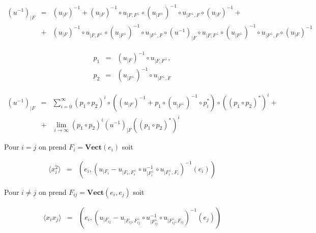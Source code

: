 \begin{aff}
\begin{eqnarray*}
	\left (u^{-1} \right )_{\vert F} & = & 	 \left (u_{\vert F }\right )^{-1}  +  \left (u_{\vert F }\right )^{-1} \circ u_{\vert F , F^\perp }\circ  \left ( u_{\vert F^\perp } \right)^{-1} \circ u_{\vert F^\perp , F } \circ  \left (u_{\vert F }\right )^{-1} + \\
	& + & \left (u_{\vert F }\right )^{-1} \circ u_{\vert F , F^\perp }\circ \left (u_{\vert F^\perp }\right )^{-1} \circ u_{\vert F ^\perp, F }\circ \left (u^{-1} \right )_{\vert F} \circ u_{\vert F, F ^\perp } \circ \left (u_{\vert F^\perp }\right )^{-1} \circ  u_{\vert F ^\perp, F } \circ \left (u_{\vert F }\right )^{-1}
\end{eqnarray*}

\begin{eqnarray*}
	p_1 & = & 	\left (u_{\vert F }\right )^{-1} \circ u_{\vert F , F^\perp } , \\
	p_2 & = & \left (u_{\vert F^\perp }\right )^{-1} \circ u_{\vert F ^\perp, F }
\end{eqnarray*}

\begin{eqnarray*}
	\left (u^{-1} \right )_{\vert F}  & = & \sum_{i = 0 }^\infty (p_	1 \circ p_2)^i \circ \left ( \left (u_{\vert F }\right )^{-1} + p_1 \circ \left ( u_{\vert F^\perp } \right)^{-1}  \circ p_i^\ast \right ) \circ	((p_	1 \circ p_2)^\ast )^i + \\
	&+ & \underset{i \to \infty}{\lim}  (p_	1 \circ p_2)^i \left (u^{-1} \right )_{\vert F} ((p_	1 \circ p_2)^\ast )^i
\end{eqnarray*}


	
\end{aff}



Pour $i = j$ on prend $F_i = \mathbf{Vect} ( e_i) $ soit 

\begin{eqnarray*}
	\langle x_i^2 \rangle  & = & \left ( e_i , \left ( u_{\vert F_i }- u_{\vert F_i, F_i^\perp} \circ u_{\vert F_i^\perp}^{-1} \circ u_{\vert F_i^\perp, F_i} \right )^{-1} \left (e_i\right ) \right ) 
\end{eqnarray*}

Pour $i \neq j$ on prend $F_{ij} = \mathbf{Vect} ( e_i , e_j) $ soit 

\begin{eqnarray*}
	\langle x_i x_j \rangle  & = & \left ( e_i , \left ( u_{\vert F_{ij} }- u_{\vert F_{ij}, F_{ij}^\perp} \circ u_{\vert F_{ij}^\perp}^{-1} \circ u_{\vert F_{ij}^\perp, F_{ij}} \right )^{-1} \left (e_j\right ) \right ) 
\end{eqnarray*}


